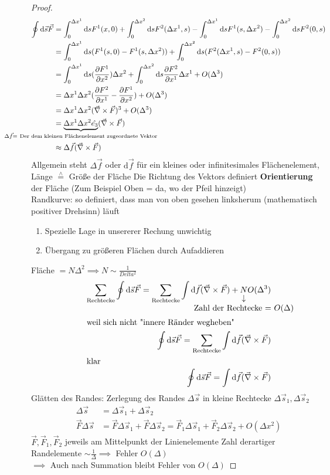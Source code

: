 \documentclass[a4paper]{scrartcl}
\newcommand{\estimates}{\overset{\scriptscriptstyle\wedge}{=}}
\renewcommand{\d}{\mathrm{d}}
\renewcommand{\v}[1]{\vec{#1}}
\theoremstyle{definition}
\theoremstyle{plain}
\theoremstyle{remark}
\theoremstyle{remark}
\begin{document}
\begin{proof}
\begin{align*}
\oint \d\v s\v F &= \int_0^{\Delta x^1}\d s F^1(x,0) + \int_0^{\Delta x^2}\d s F^2(\Delta x^1, s) - \int_0^{\Delta x^1}\d s F^1(s, \Delta x^2) - \int_0^{\Delta x^2}\d s F^2(0,s) \\
&= \int_0^{\Delta x^1}\d s(F^1(s,0) - F^1(s,\Delta x^2)) + \int_0^{\Delta x^2}\d s(F^2(\Delta x^1, s) - F^2(0,s)) \\
&= \int_0^{\Delta x^1}\d s(\frac{\partial F^1}{\partial x^2})\Delta x^2 + \int_0^{\Delta x^2}\d s \frac{\partial F^2}{\partial x^1}\Delta x^1 + O(\Delta^3) \\
&= \Delta x^1 \Delta x^2(\frac{\partial F^2}{\partial x^1} - \frac{\partial F^1}{\partial x^2}) + O(\Delta^3) \\
&= \Delta x^1 \Delta x^2(\v\nabla \times \v F)^3 + O(\Delta^3) \\
&= \underbrace{\Delta x^1 \Delta x^2 \hat{e_3}}_{\mathclap{\Delta \v f = ~\text{Der dem kleinen Flächenelement zugeordnete Vektor}}} (\v\nabla \times \v F) \\
&\approx \Delta \v f(\v \nabla \times \v F)
\end{align*}
Allgemein steht $\Delta \v f$ oder $\d \v f$ für ein kleines oder infinitesimales Flächenelement, Länge $\estimates$ Größe der Fläche
Die Richtung des Vektors definiert \textbf{Orientierung} der Fläche (Zum Beispiel Oben = da, wo der Pfeil hinzeigt) \\
   Randkurve: so definiert, dass man von oben gesehen linksherum (mathematisch positiver Drehsinn) läuft
\begin{enumerate}
\item Spezielle Lage in unsererer Rechung unwichtig
\item Übergang zu größeren Flächen durch Aufaddieren
\end{enumerate}
Fläche $= N\Delta ^2 \implies N\sim \frac{1}{Delta^2}$
\begin{align*}
\sum_{\text{Rechtecke}} \oint\d \v s\v F = \sum_{\text{Rechtecke}} \int\d\v f(\v\nabla \times \v F) + \underarrow[N]{Zahl der Rechtecke = $O(\Delta)$} O(\Delta^3) \\
\shortintertext{weil sich nicht "innere Ränder wegheben"}
\oint\d \v s\v F = \sum_{\text{Rechtecke}} \int\d\v f(\v\nabla \times \v F) \\
\shortintertext{klar}
\oint\d \v s\v F = \int\d\v f(\v\nabla \times \v F) \\
\end{align*}
Glätten des Randes:
Zerlegung des Randes $\Delta \v s$ in kleine Rechtecke $\Delta \v s_1, \Delta \v s_2$
\begin{align*}
\Delta \v s &= \Delta \v s_1 + \Delta \v s_2 \\
\v F \Delta\v s &= \v F \Delta \v s_1 + \v F \Delta \v s_2 = \v F_1 \Delta \v s_1 + \v F_2 \Delta \v s_2 + O(\Delta x^2)
\end{align*}
$\v F, \v F_1, \v F_2$ jeweils am Mittelpunkt der Linienelemente
Zahl derartiger Randelemente $\sim \frac{1}{\Delta} \implies$ Fehler $O(\Delta)$ \\
   $\implies$ Auch nach Summation bleibt Fehler von $O(\Delta)$


\end{proof}
\end{document}
